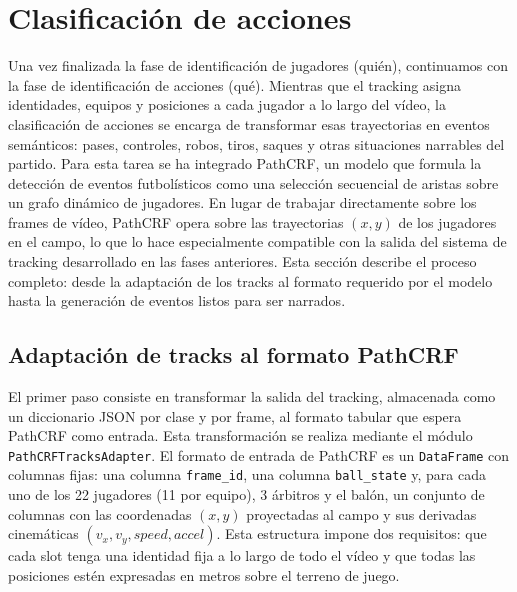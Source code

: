 \section{Clasificación de acciones}
\label{sec:clasificacion-acciones}

Una vez finalizada la fase de identificación de jugadores (quién), continuamos con la fase de identificación de acciones (qué). Mientras que el tracking asigna identidades, equipos y posiciones a cada jugador a lo largo del vídeo, la clasificación de acciones se encarga de transformar esas trayectorias en eventos semánticos: pases, controles, robos, tiros, saques y otras situaciones narrables del partido.
Para esta tarea se ha integrado PathCRF, un modelo que formula la detección de eventos futbolísticos como una selección secuencial de aristas sobre un grafo dinámico de jugadores. En lugar de trabajar directamente sobre los frames de vídeo, PathCRF opera sobre las trayectorias $(x,y)$ de los jugadores en el campo, lo que lo hace especialmente compatible con la salida del sistema de tracking desarrollado en las fases anteriores. Esta sección describe el proceso completo: desde la adaptación de los tracks al formato requerido por el modelo hasta la generación de eventos listos para ser narrados.
\subsection{Adaptación de tracks al formato PathCRF}
El primer paso consiste en transformar la salida del tracking, almacenada como un diccionario JSON por clase y por frame, al formato tabular que espera PathCRF como entrada. Esta transformación se realiza mediante el módulo \texttt{PathCRFTracksAdapter}.
El formato de entrada de PathCRF es un \texttt{DataFrame} con columnas fijas: una columna \texttt{frame\_id}, una columna \texttt{ball\_state} y, para cada uno de los 22 jugadores (11 por equipo), 3 árbitros y el balón, un conjunto de columnas con las coordenadas $(x,y)$ proyectadas al campo y sus derivadas cinemáticas $(v_x, v_y, \textit{speed}, \textit{accel})$. Esta estructura impone dos requisitos: que cada slot tenga una identidad fija a lo largo de todo el vídeo y que todas las posiciones estén expresadas en metros sobre el terreno de juego.
